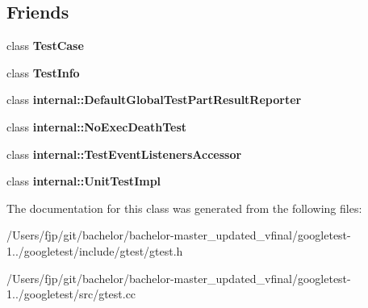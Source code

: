 \subsection*{Friends}
\begin{DoxyCompactItemize}
\item 
\mbox{\label{classtesting_1_1_test_event_listeners_aff779e55b06adfa7c0088bd10253f0f0}} 
class {\bfseries Test\+Case}
\item 
\mbox{\label{classtesting_1_1_test_event_listeners_a4c49c2cdb6c328e6b709b4542f23de3c}} 
class {\bfseries Test\+Info}
\item 
\mbox{\label{classtesting_1_1_test_event_listeners_abae39633da9932847b41cb80efd62115}} 
class {\bfseries internal\+::\+Default\+Global\+Test\+Part\+Result\+Reporter}
\item 
\mbox{\label{classtesting_1_1_test_event_listeners_afddba49fdf3f493532b4d5efb9814f4e}} 
class {\bfseries internal\+::\+No\+Exec\+Death\+Test}
\item 
\mbox{\label{classtesting_1_1_test_event_listeners_addbc107b6b445617c880182bd4f44cf9}} 
class {\bfseries internal\+::\+Test\+Event\+Listeners\+Accessor}
\item 
\mbox{\label{classtesting_1_1_test_event_listeners_acc0a5e7573fd6ae7ad1878613bb86853}} 
class {\bfseries internal\+::\+Unit\+Test\+Impl}
\end{DoxyCompactItemize}


The documentation for this class was generated from the following files\+:\begin{DoxyCompactItemize}
\item 
/\+Users/fjp/git/bachelor/bachelor-\/master\+\_\+updated\+\_\+vfinal/googletest-\/1../googletest/include/gtest/gtest.\+h\item 
/\+Users/fjp/git/bachelor/bachelor-\/master\+\_\+updated\+\_\+vfinal/googletest-\/1../googletest/src/gtest.\+cc\end{DoxyCompactItemize}
